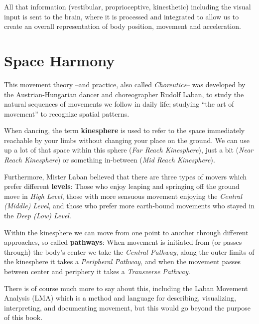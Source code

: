 All that information (vestibular, proprioceptive, kinesthetic) including the visual input is sent to the brain, where it is processed and integrated to allow us to create an overall representation of body position, movement and acceleration.

\section{Space Harmony}\label{sec:space-harmony}

This movement theory --and practice, also called \textit{Choreutics}-- was developed by the Austrian-Hungarian dancer and choreographer Rudolf Laban, to study the natural sequences of movements we follow in daily life; studying ``the art of movement'' to recognize spatial patterns.

When dancing, the term \textbf{\gls{kinesphere}} is used to refer to the space immediately reachable by your limbs without changing your place on the ground.
We can use up a lot of that space within this sphere (\textit{Far Reach Kinesphere}), just a bit (\textit{Near Reach Kinesphere}) or something in-between (\textit{Mid Reach Kinesphere}).

Furthermore, Mister Laban believed that there are three types of movers which prefer different \textbf{levels}: Those who enjoy leaping and springing off the ground move in \textit{High Level}, those with more sensuous movement enjoying the \textit{Central (Middle) Level}, and those who prefer more earth-bound movements who stayed in the \textit{Deep (Low) Level}.

Within the kinesphere we can move from one point to another through different approaches, so-called \textbf{pathways}: When movement is initiated from (or passes through) the body's center we take the \textit{Central Pathway}, along the outer limits of the kinesphere it takes a \textit{Peripheral Pathway}, and when the movement passes between center and periphery it takes a \textit{Transverse Pathway}.

There is of course much more to say about this, including the Laban Movement Analysis (LMA) which is a method and language for describing, visualizing, interpreting, and documenting movement, but this would go beyond the purpose of this book.
